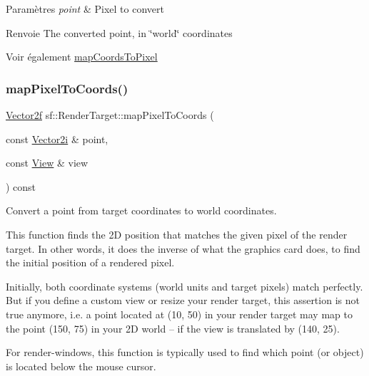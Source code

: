 \begin{DoxyParams}{Paramètres}
{\em point} & Pixel to convert\\
\hline
\end{DoxyParams}
\begin{DoxyReturn}{Renvoie}
The converted point, in \char`\"{}world\char`\"{} coordinates
\end{DoxyReturn}
\begin{DoxySeeAlso}{Voir également}
\hyperlink{classsf_1_1RenderTarget_ad92a9f0283aa5f3f67e473c1105b68cf}{map\+Coords\+To\+Pixel} 
\end{DoxySeeAlso}
\mbox{\label{classsf_1_1RenderTarget_a2d3e9d7c4a1f5ea7e52b06f53e3011f9}} 
\subsubsection{\texorpdfstring{map\+Pixel\+To\+Coords()}{mapPixelToCoords()}\hspace{0.1cm}{\footnotesize\ttfamily [2/2]}}
{\footnotesize\ttfamily \hyperlink{classsf_1_1Vector2}{Vector2f} sf\+::\+Render\+Target\+::map\+Pixel\+To\+Coords (\begin{DoxyParamCaption}\item[{const \hyperlink{classsf_1_1Vector2}{Vector2i} \&}]{point,  }\item[{const \hyperlink{classsf_1_1View}{View} \&}]{view }\end{DoxyParamCaption}) const}



Convert a point from target coordinates to world coordinates. 

This function finds the 2D position that matches the given pixel of the render target. In other words, it does the inverse of what the graphics card does, to find the initial position of a rendered pixel.

Initially, both coordinate systems (world units and target pixels) match perfectly. But if you define a custom view or resize your render target, this assertion is not true anymore, i.\+e. a point located at (10, 50) in your render target may map to the point (150, 75) in your 2D world -- if the view is translated by (140, 25).

For render-\/windows, this function is typically used to find which point (or object) is located below the mouse cursor.

